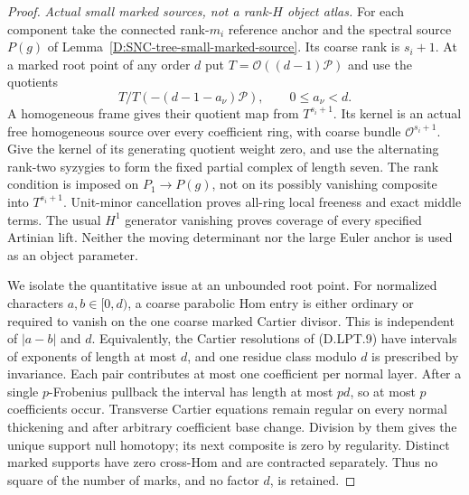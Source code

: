 \begin{proof}
\emph{Actual small marked sources, not a rank-$H$ object atlas.}
For each component take the connected rank-$m_i$ reference anchor
and the spectral source $P(g)$ of
Lemma~\ref{D:SNC-tree-small-marked-source}. Its coarse rank is
$s_i+1$. At a marked root point of any order $d$ put
$T=\mathcal O((d-1)\mathcal P)$ and use the quotients
\[
                 T/T(-(d-1-a_\nu)\mathcal P),
                  \qquad 0\le a_\nu<d.
 \tag{D.LPT.9}
\]
A homogeneous frame gives their quotient map from $T^{s_i+1}$.
Its kernel is an actual free homogeneous source over every
coefficient ring, with coarse bundle $\mathcal O^{s_i+1}$.
Give the kernel of its generating quotient weight zero, and use
the alternating rank-two syzygies to form the fixed partial
complex of length seven. The rank condition is imposed on
$P_1\to P(g)$, not on its possibly vanishing composite into
$T^{s_i+1}$. Unit-minor cancellation proves all-ring local
freeness and exact middle terms. The usual $H^1$ generator
vanishing proves coverage of every specified Artinian lift.
Neither the moving determinant nor the large Euler anchor is
used as an object parameter.

We isolate the quantitative issue at an unbounded root point.
For normalized characters $a,b\in[0,d)$, a coarse parabolic Hom
entry is either ordinary or required to vanish on the one coarse
marked Cartier divisor. This is independent of $|a-b|$ and $d$.
Equivalently, the Cartier resolutions of (D.LPT.9) have intervals
of exponents of length at most $d$, and one residue class modulo
$d$ is prescribed by invariance. Each pair contributes at most
one coefficient per normal layer. After a single $p$-Frobenius
pullback the interval has length at most $pd$, so at most $p$
coefficients occur. Transverse Cartier equations remain regular
on every normal thickening and after arbitrary coefficient base
change. Division by them gives the unique support null homotopy;
its next composite is zero by regularity. Distinct marked supports
have zero cross-Hom and are contracted separately. Thus no
square of the number of marks, and no factor $d$, is retained.


\end{proof}
